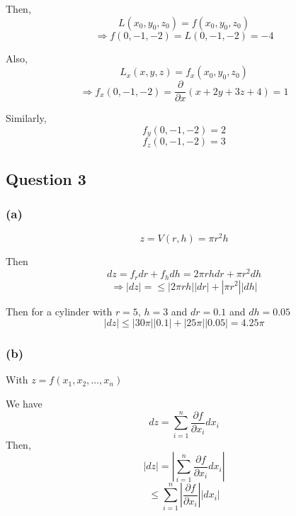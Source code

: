 \documentclass{article}
\begin{document}
Then,
\[
L(x_0,y_0,z_0) = f(x_0,y_0,z_0)
\]
\[
\Rightarrow f(0,-1,-2) = L(0,-1,-2) = -4
\]

Also,
\[
L_x(x,y,z) = f_x(x_0,y_0,z_0)
\]
\[
\Rightarrow f_x(0,-1,-2) = \frac{\partial}{\partial x} (x + 2y + 3z + 4) = 1
\]

Similarly,
\[
f_y(0,-1,-2) = 2
\]
\[
f_z(0,-1,-2) = 3
\]

\subsection*{Question 3}
\subsubsection*{(a)}
\[
z = V(r, h) = \pi r^2 h
\]

Then
\[
dz = f_r dr + f_h dh = 2\pi rh dr + \pi r^2 dh
\]
\[
\Rightarrow |dz| = \leq |2\pi rh||dr| + |\pi r^2| |dh|
\]

Then for a cylinder with \(r = 5\), \(h=3\) and \(dr = 0.1\) and \(dh = 0.05\)
\[
|dz| \leq |30 \pi||0.1| + |25 \pi||0.05| = 4.25 \pi
\]

\subsubsection*{(b)}
With \(z = f(x_1, x_2, \dots , x_n)\)

We have 
\[
dz =   \sum_{i=1}^n \frac{\partial f}{\partial x_i} dx_i
\]
Then,
\[
|dz| = |\sum_{i=1}^n \frac{\partial f}{\partial x_i} dx_i|
\]
\[
\leq \sum_{i=1}^n |\frac{\partial f}{\partial x_i}|| dx_i|
\]
\end{document}
